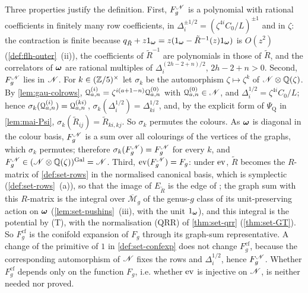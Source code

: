 Three properties justify the definition. First, $F_g^{\mathscr{N}}$ is a polynomial with rational coefficients in finitely many row coefficients, in $\Delta_i^{\pm1/2}=(\zeta^{4i}C_0/L)^{\pm1}$ and in $\zeta$: the contraction is finite because $q_{\tilde R}+z1_{\boldsymbol{\omega}}=z(1_{\boldsymbol{\omega}}-\tilde R^{-1}(z)1_{\boldsymbol{\omega}})$ is $O(z^2)$ (\cref{def:flh-outer}~(ii)), the coefficients of $\tilde R^{-1}$ are polynomials in those of $\tilde R$, and the correlators of $\boldsymbol{\omega}$ are rational multiples of $\Delta_i^{(2h-2+n)/2}$, $2h-2+n>0$. Second, $F_g^{\mathscr{N}}$ lies in $\mathscr{N}$. For $k\in(\mathbb{Z}/5)^\times$ let $\sigma_k$ be the automorphism $\zeta\mapsto\zeta^k$ of $\mathscr{N}\otimes\mathbb{Q}(\zeta)$. By \cref{lem:gau-colrows}, $\mathcal{Q}^{(i)}_{a,n}=\zeta^{i(a+1-n)}\mathcal{Q}^{(0)}_{a,n}$ with $\mathcal{Q}^{(0)}_{a,n}\in\mathscr{N}$, and $\Delta_i^{1/2}=\zeta^{4i}C_0/L$; hence $\sigma_k(\mathcal{Q}^{(i)}_{a,n})=\mathcal{Q}^{(ki)}_{a,n}$, $\sigma_k(\Delta_i^{1/2})=\Delta_{ki}^{1/2}$, and, by the explicit form of $\Psi_{\mathrm Q}$ in \cref{lem:mai-Psi}, $\sigma_k(\tilde R_{ij})=\tilde R_{ki,kj}$. So $\sigma_k$ permutes the colours. As $\boldsymbol{\omega}$ is diagonal in the colour basis, $F_g^{\mathscr{N}}$ is a sum over all colourings of the vertices of the graphs, which $\sigma_k$ permutes; therefore $\sigma_k(F_g^{\mathscr{N}})=F_g^{\mathscr{N}}$ for every $k$, and $F_g^{\mathscr{N}}\in(\mathscr{N}\otimes\mathbb{Q}(\zeta))^{\mathrm{Gal}}=\mathscr{N}$. Third, $\operatorname{ev}(F_g^{\mathscr{N}})=F_g$: under $\operatorname{ev}$, $\tilde R$ becomes the $R$-matrix of \cref{def:set-rows} in the normalised canonical basis, which is symplectic (\cref{def:set-rows}~(a)), so that the image of $E_{\tilde R}$ is the edge of \cite[Def.~2.2]{PPZ15}; the graph sum with this $R$-matrix is the integral over $\overline{\mathcal M}_g$ of the genus-$g$ class of its unit-preserving action on $\boldsymbol{\omega}$ (\cref{lem:set-pushins}~(iii), with the unit $1_{\boldsymbol{\omega}}$), and this integral is the potential by (T), with the normalisation (QRR) of \cref{thm:set-qrr} (\cref{thm:set-GT}). So $F_g^{\mathrm{cf}}$ is the conifold expansion of $F_g$ through its graph-sum representative. A change of the primitive of $1$ in \cref{def:set-confexp} does not change $F_g^{\mathrm{cf}}$, because the corresponding automorphism of $\mathscr{N}$ fixes the rows and $\Delta_i^{1/2}$, hence $F_g^{\mathscr{N}}$. Whether $F_g^{\mathrm{cf}}$ depends only on the function $F_g$, i.e. whether $\operatorname{ev}$ is injective on $\mathscr{N}$, is neither needed nor proved.


